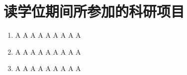 \chapter{读学位期间所参加的科研项目}

\begin{enumerate}
\item A A A A A A A A A
\item A A A A A A A A A
\item A A A A A A A A A
\end{enumerate}